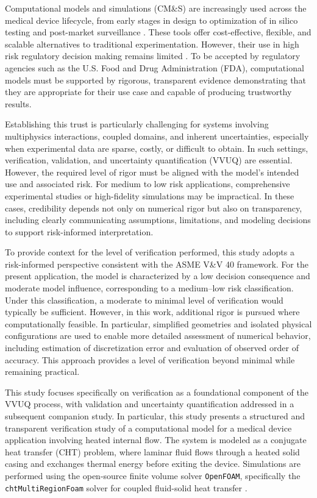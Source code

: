 Computational models and simulations (CM\&S) are increasingly used across the medical device lifecycle, from early stages in design to optimization of in silico testing and post-market surveillance \cite{morrisonFrontiers}. These tools offer cost-effective, flexible, and scalable alternatives to traditional experimentation. However, their use in high risk regulatory decision making remains limited \cite{fda_credibility_program, fda2022Success}. To be accepted by regulatory agencies such as the U.S. Food and Drug Administration (FDA), computational models must be supported by rigorous, transparent evidence demonstrating that they are appropriate for their use case and capable of producing trustworthy results. 

Establishing this trust is particularly challenging for systems involving multiphysics interactions, coupled domains, and inherent uncertainties, especially when experimental data are sparse, costly, or difficult to obtain. In such settings, verification, validation, and uncertainty quantification (VVUQ) are essential. However, the required level of rigor must be aligned with the model’s intended use and associated risk. For medium to low risk applications, comprehensive experimental studies or high-fidelity simulations may be impractical. In these cases, credibility depends not only on numerical rigor but also on transparency, including clearly communicating assumptions, limitations, and modeling decisions to support risk-informed interpretation.

To provide context for the level of verification performed, this study adopts a risk-informed perspective consistent with the ASME V\&V 40 framework. For the present application, the model is characterized by a low decision consequence and moderate model influence, corresponding to a medium–low risk classification. Under this classification, a moderate to minimal level of verification would typically be sufficient. However, in this work, additional rigor is pursued where computationally feasible. In particular, simplified geometries and isolated physical configurations are used to enable more detailed assessment of numerical behavior, including estimation of discretization error and evaluation of observed order of accuracy. This approach provides a level of verification beyond minimal while remaining practical.

This study focuses specifically on verification as a foundational component of the VVUQ process, with validation and uncertainty quantification addressed in a subsequent companion study. In particular, this study presents a structured and transparent verification study of a computational model for a medical device application involving heated internal flow. The system is modeled as a conjugate heat transfer (CHT) problem, where laminar fluid flows through a heated solid casing and exchanges thermal energy before exiting the device. Simulations are performed using the open-source finite volume solver \texttt{OpenFOAM}, specifically the \texttt{chtMultiRegionFoam} solver for coupled fluid-solid heat transfer  \cite{openfoamSolvers, chtMultiRegion}.

